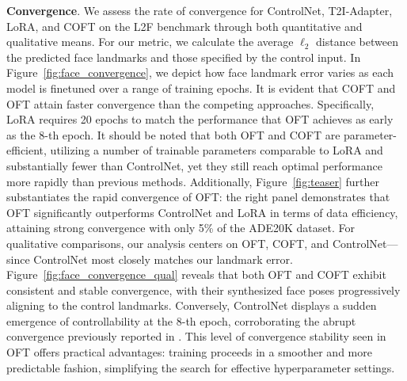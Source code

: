 \textbf{Convergence}. We assess the rate of convergence for ControlNet, T2I-Adapter, LoRA, and COFT on the L2F benchmark through both quantitative and qualitative means. For our metric, we calculate the average $\ell_2$ distance between the predicted face landmarks and those specified by the control input. In Figure~\ref{fig:face_convergence}, we depict how face landmark error varies as each model is finetuned over a range of training epochs. It is evident that COFT and OFT attain faster convergence than the competing approaches. Specifically, LoRA requires 20 epochs to match the performance that OFT achieves as early as the 8-th epoch. It should be noted that both OFT and COFT are parameter-efficient, utilizing a number of trainable parameters comparable to LoRA and substantially fewer than ControlNet, yet they still reach optimal performance more rapidly than previous methods. Additionally, Figure~\ref{fig:teaser} further substantiates the rapid convergence of OFT: the right panel demonstrates that OFT significantly outperforms ControlNet and LoRA in terms of data efficiency, attaining strong convergence with only 5\% of the ADE20K dataset. For qualitative comparisons, our analysis centers on OFT, COFT, and ControlNet—since ControlNet most closely matches our landmark error. Figure~\ref{fig:face_convergence_qual} reveals that both OFT and COFT exhibit consistent and stable convergence, with their synthesized face poses progressively aligning to the control landmarks. Conversely, ControlNet displays a sudden emergence of controllability at the 8-th epoch, corroborating the abrupt convergence previously reported in \cite{zhang2023adding}. This level of convergence stability seen in OFT offers practical advantages: training proceeds in a smoother and more predictable fashion, simplifying the search for effective hyperparameter settings.

